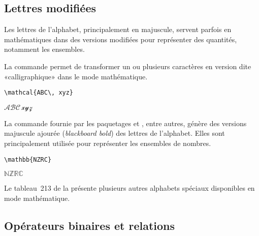 \subsection{Lettres modifiées}
\label{sec:math:symboles:mathcal}

Les lettres de l'alphabet, principalement en majuscule, servent
parfois en mathématiques dans des versions modifiées pour représenter
des quantités, notamment les ensembles.

La commande \cmd{\mathcal} permet de transformer un ou plusieurs
caractères en version dite «calligraphique» dans le mode mathématique.
\begin{demo}
  \begin{texample}
\begin{lstlisting}
\mathcal{ABC\, xyz}
\end{lstlisting}
    \producing
    $\mathscr{ABC\, xyz}$
  \end{texample}
\end{demo}

La commande \cmd{\mathbb} fournie par les paquetages  et
, entre autres, génère des versions majuscule
ajourée (\emph{blackboard bold}) des lettres de l'alphabet. Elles sont
principalement utilisée pour représenter les ensembles de nombres.
\begin{demo}
  \begin{texample}
\begin{lstlisting}
\mathbb{NZRC}
\end{lstlisting}
    \producing $\mathbb{NZRC}$
  \end{texample}
\end{demo}

Le tableau~213 de la %
présente plusieurs autres alphabets spéciaux disponibles en mode
mathématique.


\subsection{Opérateurs binaires et relations}
\label{sec:math:symboles:binaires+relations}

